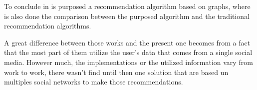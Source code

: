 To conclude in \cite{prediction-social-network} is purposed a recommendation algorithm based on graphs, where is also done the comparison between the purposed algorithm and the traditional recommendation algorithms. 

A great difference between those works and the present one becomes from a fact that the most part of them utilize the user’s data that comes from a single social media. However much, the implementations or the utilized information vary from work to work, there wasn’t find until then one solution that are based un multiples social networks to make those recommendations. 


